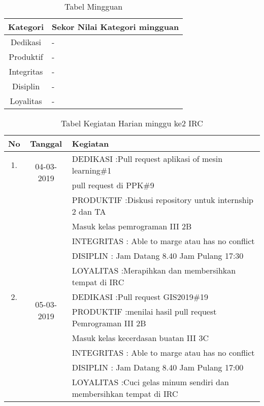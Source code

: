 \begin{table}[h]
\begin{center}
\caption{Tabel Mingguan}
\begin{tabular}{|c|l|}
\hline
Kategori& Sekor Nilai Kategori mingguan\\
\hline
Dedikasi & -\\
\hline
Produktif & -\\
\hline
Integritas & -\\
\hline
Disiplin & -\\
\hline
Loyalitas & -\\
\hline
\end{tabular}
\end{center}
\label {Tabel:contoh} 
\end{table}

\begin{table}[h]
\caption{Tabel Kegiatan Harian minggu ke2 IRC}
\centering
\begin{tabular}{|c|c|l|}
\hline
No&Tanggal&Kegiatan\\
\hline
1.&\multirow{2}{*}{04-03-2019}
&DEDIKASI :Pull request aplikasi of mesin learning\#1\\
		&&pull request di PPK\#9 \\
&&PRODUKTIF :Diskusi repository untuk internship 2 dan TA\\
		     &&Masuk kelas pemrograman III 2B\\
&&INTEGRITAS : Able to marge atau has no conflict\\
&&DISIPLIN : Jam Datang 8.40 Jam Pulang 17:30\\
&&LOYALITAS :Merapihkan dan membersihkan tempat di IRC\\
\hline
2.&\multirow{2}{*}{05-03-2019}
&DEDIKASI :Pull request GIS2019\#19\\
&&PRODUKTIF :menilai hasil pull request Pemrograman III 2B\\
		     &&Masuk kelas kecerdasan buatan III 3C\\
&&INTEGRITAS : Able to marge atau has no conflict\\
&&DISIPLIN : Jam Datang 8.40 Jam Pulang 17:00\\
&&LOYALITAS :Cuci gelas minum sendiri dan membersihkan tempat di IRC\\
\hline
\end{tabular}
\label{table:contoh}
\end{table}